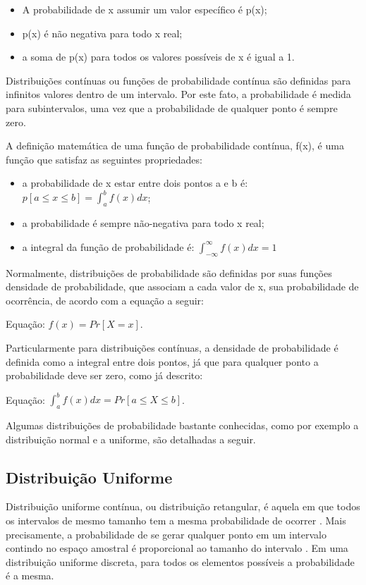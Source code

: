 \begin{itemize}
	\item A probabilidade de x assumir um valor específico é p(x);
	\item p(x) é não negativa para todo x real;
	\item a soma de p(x) para todos os valores possíveis de x é igual a 1.
\end{itemize}

Distribuições contínuas ou funções de probabilidade contínua são definidas para infinitos valores dentro de um intervalo. Por este fato, a probabilidade é medida para subintervalos, uma vez que a probabilidade de qualquer ponto é sempre zero\cite{distteoria}.

A definição matemática de uma função de probabilidade contínua, f(x), é uma função que satisfaz as seguintes propriedades:

\begin{itemize}
	\item a probabilidade de x estar entre dois pontos a e b é: \(p[a \leqslant x \leqslant b] = \int_{a}^{b}f(x)dx\);
	\item a probabilidade é sempre não-negativa para todo x real;
	\item a integral da função de probabilidade é: \(\int_{-\infty}^{\infty}f(x)dx = 1\)
\end{itemize}

Normalmente, distribuições de probabilidade são definidas por suas funções densidade de probabilidade, que associam a cada valor de x, sua probabilidade de ocorrência, de acordo com a equação a seguir: 

Equação: \(f(x) = Pr[X = x]\).

Particularmente para distribuições contínuas, a densidade de probabilidade é definida como a integral entre dois pontos, já que para qualquer ponto a probabilidade deve ser zero, como já descrito:

Equação: \(\int_{a}^{b}f(x)dx = Pr[a \leqslant X \leqslant b]\).

Algumas distribuições de probabilidade bastante conhecidas, como por exemplo a distribuição normal e a uniforme, são detalhadas a seguir.

\subsection{Distribuição Uniforme}

Distribuição uniforme contínua, ou distribuição retangular, é aquela em que todos os intervalos de mesmo tamanho tem a mesma probabilidade de ocorrer \cite{wikidistuniforme1}. Mais precisamente, a probabilidade de se gerar qualquer ponto em um intervalo contindo no espaço amostral é proporcional ao tamanho do intervalo \cite{wikidistuniforme2}. Em uma distribuição uniforme discreta, para todos os elementos possíveis a probabilidade é a mesma.

